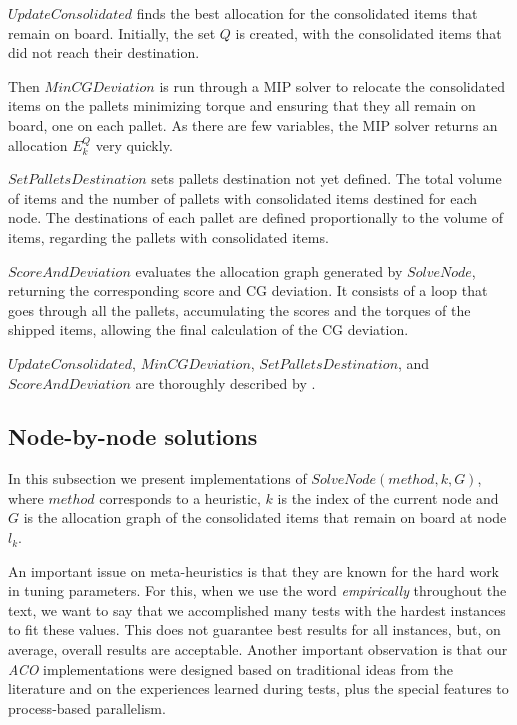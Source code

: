 \documentclass[preprint,authoryear]{elsarticle}
\begin{document}
$UpdateConsolidated$ finds the best allocation for the consolidated items that remain on board. Initially, the set $Q$ is created, with the consolidated items that did not reach their destination.

Then $MinCGDeviation$ is run through a MIP solver to relocate the consolidated items on the pallets minimizing torque and ensuring that they all remain on board, one on each pallet. As there are few variables, the MIP solver returns an allocation $E^Q_k$ very quickly.

$SetPalletsDestination$ sets pallets destination not yet defined. The total volume of items and the number of pallets with consolidated items destined for each node. The destinations of each pallet are defined proportionally to the volume of items, regarding the pallets with consolidated items.

$ScoreAndDeviation$ evaluates the allocation graph generated by $SolveNode$, returning the corresponding score and CG deviation. It consists of a loop that goes through all the pallets, accumulating the scores and the torques of the shipped items, allowing the final calculation of the CG deviation.

$UpdateConsolidated$, $MinCGDeviation$, $SetPalletsDestination$, and $ScoreAndDeviation$ are thoroughly described by \cite{MesquitaSanches2023}.


\subsection{Node-by-node solutions}
\label{methods}


In this subsection we present implementations of $SolveNode(method,k, G)$, where $method$\/ corresponds to a heuristic, $k$\/ is the index of the current node and $G$\/ is the allocation graph of the consolidated items that remain on board at node $l_k$.

An important issue on meta-heuristics is that they are known for the hard work in tuning parameters. For this, when we use the word {\it empirically}\/ throughout the text, we want to say that we accomplished many tests with the hardest instances to fit these values. This does not guarantee best results for all instances, but, on average, overall results are acceptable. Another important observation is that our {\it ACO} implementations were designed based on traditional ideas from the literature \cite{Fidanova2006} and on the experiences learned during tests, plus the special features to process-based parallelism.
\end{document}
